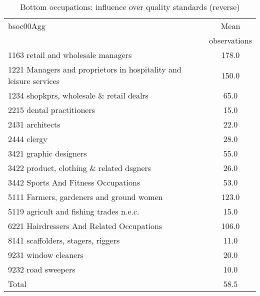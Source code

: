 \begin{table}
	\centering
	\caption{Bottom occupations: influence over quality standards (reverse)}
	\begin{tabular}{lc}
	\toprule	
		
bsoc00Agg&Mean \\
&observations \\
\hline
1163 retail and wholesale managers&178.0 \\
1221 Managers and proprietors in hospitality and leisure services&150.0 \\
1234 shopkprs, wholesale \& retail dealrs&65.0 \\
2215 dental practitioners&15.0 \\
2431 architects&22.0 \\
2444 clergy&28.0 \\
3421 graphic designers&55.0 \\
3422 product, clothing \& related dsgners&26.0 \\
3442 Sports And Fitness Occupations&53.0 \\
5111 Farmers, gardeners and ground women&123.0 \\
5119 agricult and fishing trades n.e.c.&15.0 \\
6221 Hairdressers And Related Occupations&106.0 \\
8141 scaffolders, stagers, riggers&11.0 \\
9231 window cleaners&20.0 \\
9232 road sweepers&10.0 \\
Total&58.5 \\
\bottomrule
\bottomrule
\end{tabular}
\end{table}
